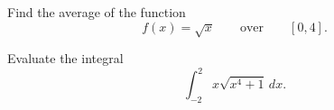 \begin{exercise}

Find the average of the function
\[f(x)=\sqrt{x}\qquad\text{over}\qquad [0,4].\]

\end{exercise}
\vspace*{6\baselineskip}


\begin{exercise}

Evaluate the integral \[\int_{-2}^2 x\sqrt{x^4+1}\,dx.\]

\end{exercise}

